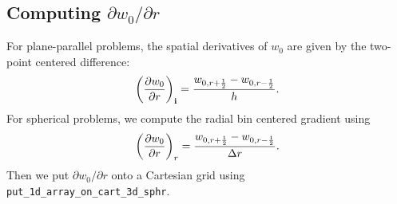 \subsection{Computing $\partial w_0/\partial r$}
For plane-parallel problems, the spatial derivatives of $w_0$ 
are given by the two-point centered difference:
\begin{equation}
\left(\frac{\partial w_0}{\partial r}\right)_{{\bf i}} = \frac{w_{0,r+\frac{1}{2}}-w_{0,r-\frac{1}{2}}}{h}.
\end{equation}
For spherical problems, we compute the radial bin centered gradient using
\begin{equation}
\left(\frac{\partial w_0}{\partial r}\right)_{r} = \frac{w_{0,r+\frac{1}{2}}-w_{0,r-\frac{1}{2}}}{\Delta r}.
\end{equation}
Then we put $\partial w_0/\partial r$ onto a Cartesian grid 
using {\tt put\_1d\_array\_on\_cart\_3d\_sphr}.

\newpage

